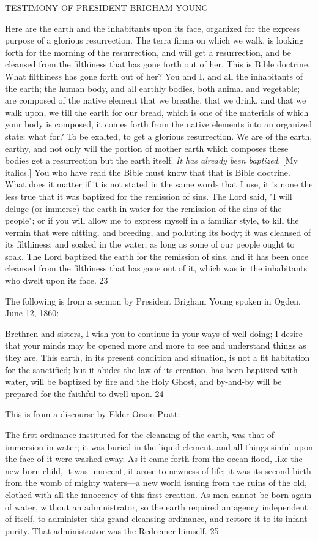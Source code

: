 TESTIMONY OF PRESIDENT BRIGHAM YOUNG

Here are the earth and the inhabitants upon its face, organized for the express purpose of a
glorious resurrection. The terra firma on which we walk, is looking forth for the morning of
the resurrection, and will get a resurrection, and be cleansed from the filthiness that has gone
forth out of her. This is Bible doctrine. What filthiness has gone forth out of her? You and I,
and all the inhabitants of the earth; the human body, and all earthly bodies, both animal and
vegetable; are composed of the native element that we breathe, that we drink, and that we
walk upon, we till the earth for our bread, which is one of the materials of which your body is
composed, it comes forth from the native elements into an organized state; what for? To be
exalted, to get a glorious resurrection. We are of the earth, earthy, and not only will the
portion of mother earth which composes these bodies get a resurrection but the earth itself. \textit{It
has already been baptized}. [My italics.] You who have read the Bible must know that that is
Bible doctrine. What does it matter if it is not stated in the same words that I use, it is none
the less true that it was baptized for the remission of sins. The Lord said, "I will deluge (or
immerse) the earth in water for the remission of the sins of the people"; or if you will allow
me to express myself in a familiar style, to kill the vermin that were nitting, and breeding,
and polluting its body; it was cleansed of its filthiness; and soaked in the water, as long as
some of our people ought to soak. The Lord baptized the earth for the remission of sins, and
it has been once cleansed from the filthiness that has gone out of it, which was in the
inhabitants who dwelt upon its face. 23

The following is from a sermon by President Brigham Young spoken in Ogden, June 12,
1860:

Brethren and sisters, I wish you to continue in your ways of well doing; I desire that your
minds may be opened more and more to see and understand things as they are. This earth, in
its present condition and situation, is not a fit habitation for the sanctified; but it abides the
law of its creation, has been baptized with water, will be baptized by fire and the Holy Ghost,
and by-and-by will be prepared for the faithful to dwell upon. 24

This is from a discourse by Elder Orson Pratt:

The first ordinance instituted for the cleansing of the earth, was that of immersion in water; it
was buried in the liquid element, and all things sinful upon the face of it were washed away.
As it came forth from the ocean flood, like the new-born child, it was innocent, it arose to
newness of life; it was its second birth from the womb of mighty waters—a new world
issuing from the ruins of the old, clothed with all the innocency of this first creation. As men
cannot be born again of water, without an administrator, so the earth required an agency
independent of itself, to administer this grand cleansing ordinance, and restore it to its infant
purity. That administrator was the Redeemer himself. 25

